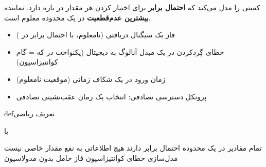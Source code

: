 کمیتی را مدل می‌کند که \textbf{احتمال برابر} برای اختیار کردن هر مقدار در بازه \lr{$[a,\, b]$} دارد. نماینده \textbf{بیشترین عدم‌قطعیت} در یک محدوده معلوم است.


\begin{itemize}
\tightlist
\item
  فاز یک سیگنال دریافتی (نامعلوم، با احتمال برابر در \lr{$[0,\, 2\pi)$})
\item
  خطای گِردکردن در یک مبدل آنالوگ به دیجیتال (یکنواخت در  که \lr{$\Delta$} = گام کوانتیزاسیون)
\item
  زمان ورود در یک شکاف زمانی (موقعیت نامعلوم)
\item
  پروتکل دسترسی تصادفی: انتخاب یک زمان عقب‌نشینی تصادفی
\end{itemize}

\begin{PSbox}[unbreakable]{def}{تعریف ریاضی}

 یا 

\end{PSbox}










\lr{\mbox{\PSyes{}}} تمام مقادیر در یک محدوده احتمال برابر دارند\PSbr{}\lr{\mbox{\PSyes{}}} هیچ اطلاعاتی به نفع مقدار خاصی نیست\PSbr{}\lr{\mbox{\PSyes{}}} مدل‌سازی خطای کوانتیزاسیون\PSbr{}\lr{\mbox{\PSyes{}}} فاز حامل بدون مدولاسیون

